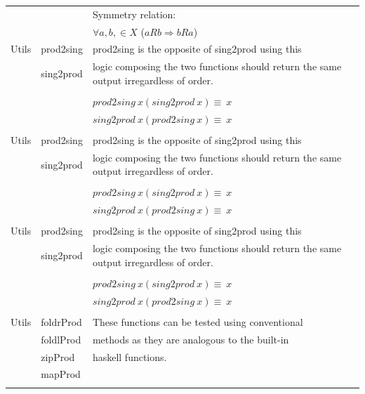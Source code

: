 \begin{center}
\begin{adjustwidth}{-2cm}{}
\begin{longtable}{ |m{1.8cm}|m{3.2cm}|m{9cm}| }
        \\ & & Symmetry relation:
        \\ & &
        $\forall a, b, \in X$ ($aRb \Rightarrow bRa$)
        \\ \hline
        Utils & prod2sing & prod2sing is the opposite of sing2prod using this \\
              & sing2prod  & logic composing the two functions should return 
              the same output irregardless of order. 
          \\  & &
          \\  & & $prod2sing\ x (sing2prod\ x) \equiv \ x$ 
          \\  & & $sing2prod\ x (prod2sing\ x) \equiv \ x$
          \\\hline
          & & \\
        Utils & prod2sing & prod2sing is the opposite of sing2prod using this \\
        & sing2prod  & logic composing the two functions should return 
        the same output irregardless of order. 
        \\  & &
        \\  & & $prod2sing\ x (sing2prod\ x) \equiv \ x$ 
        \\  & & $sing2prod\ x (prod2sing\ x) \equiv \ x$
        \\\hline
         & & \\
        Utils & prod2sing & prod2sing is the opposite of sing2prod using this \\
        & sing2prod  & logic composing the two functions should return 
        the same output irregardless of order. 
        \\  & &
        \\  & & $prod2sing\ x (sing2prod\ x) \equiv \ x$ 
        \\  & & $sing2prod\ x (prod2sing\ x) \equiv \ x$
        \\\hline
        & & \\
        Utils & foldrProd  &  These functions can be tested using conventional\\
              & foldlProd  & methods as they are analogous to the built-in\\
              & zipProd &  haskell functions.\\
              & mapProd & \\
        \\ \hline        
\end{longtable}
\end{adjustwidth}
\end{center}

